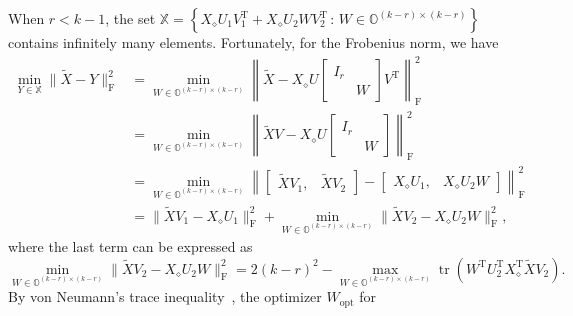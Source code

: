 \documentclass[11pt]{article}
\def\bbO{\mathbb{O}}
\def\bbX{\mathbb{X}}
\def\sss{\scriptscriptstyle}
\DeclareMathOperator*{\opt}{opt}
\DeclareMathOperator{\tr}{tr}
\DeclareMathOperator{\F}{F}
\DeclareMathOperator{\T}{T}
\def\wtd{\widetilde}
\theoremstyle{definition}
\numberwithin{equation}{section}
\numberwithin{figure}{section}
\numberwithin{table}{section}
\begin{document}
When $r<k-1$, the set $\bbX=\left\{X_{\sss\diamond}U_1V_1^{\T}+X_{\sss\diamond}U_2WV_2^{\T}\,:\, W\in\bbO^{(k-r)\times(k-r)}\right\}$
contains infinitely many elements. Fortunately,  for the Frobenius norm, we have
\begin{align*}
    \min_{Y\in\bbX}\|\wtd X-Y\|_{\F}^2&=\min_{W\in\bbO^{(k-r)\times(k-r)}}\left\|\wtd X-X_{\sss\diamond}U
                                         \begin{bmatrix}
                                            I_r &  \\
                                                &  W
                                            \end{bmatrix}V^{\T}\right\|_{\F}^2\\
                                       &=\min_{W\in\bbO^{(k-r)\times(k-r)}}\left\|\wtd XV-X_{\sss\diamond}U
                                         \begin{bmatrix}
                                            I_r &  \\
                                                &  W
                                         \end{bmatrix}\right\|_{\F}^2\\
                                       &=\min_{W\in\bbO^{(k-r)\times(k-r)}}\left\|
                                       \begin{bmatrix}
                                           \wtd XV_1, &\wtd XV_2
                                       \end{bmatrix}-\begin{bmatrix}
                                                        X_{\sss\diamond}U_1, & X_{\sss\diamond}U_2W
                                                      \end{bmatrix}
                                        \right\|_{\F}^2\\
                                       &=\|\wtd XV_1-X_{\sss\diamond}U_1\|_{\F}^2+\min_{W\in\bbO^{(k-r)\times(k-r)}}
                                       \|\wtd XV_2-X_{\sss\diamond}U_2W\|_{\F}^2,
\end{align*}
where the last term can be expressed as
\begin{equation*}
    \min_{W\in\bbO^{(k-r)\times(k-r)}}\|\wtd XV_2-X_{\sss\diamond}U_2W\|_{\F}^2=2(k-r)^2-
    \max_{W\in\bbO^{(k-r)\times(k-r)}}\tr(W^{\T}U_2^{\T}X_{\sss\diamond}^{\T}\wtd XV_2).
\end{equation*}
By von Neumann's trace inequality~\cite[section II.3.1]{stsu:1990}, the optimizer $W_{\sss\opt}$ for
\end{document}
